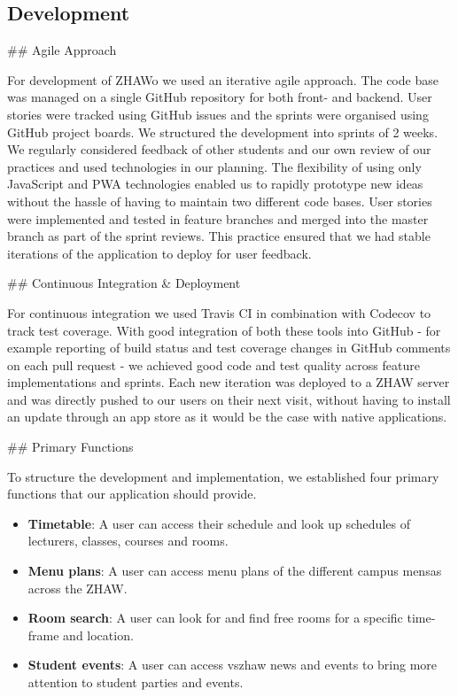 \begin{markdown}
\section{Development} \label{development}

## Agile Approach

For development of ZHAWo we used an iterative agile approach. The code base was managed on a single GitHub repository \cite{OurGithub} for both front- and backend. User stories were tracked using GitHub issues and the sprints were organised using GitHub project boards. We structured the development into sprints of 2 weeks. We regularly considered feedback of other students and our own review of our practices and used technologies in our planning. The flexibility of using only JavaScript and PWA technologies enabled us to rapidly prototype new ideas without the hassle of having to maintain two different code bases.
User stories were implemented and tested in feature branches and merged into the master branch as part of the sprint reviews. This practice ensured that we had stable iterations of the application to deploy for user feedback.

## Continuous Integration \& Deployment

For continuous integration we used Travis CI \cite{Travis} in combination with Codecov \cite{Codecov} to track test coverage. With good integration of both these tools into GitHub - for example reporting of build status and test coverage changes in GitHub comments on each pull request - we achieved good code and test quality across feature implementations and sprints.
Each new iteration was deployed to a ZHAW server and was directly pushed to our users on their next visit, without having to install an update through an app store as it would be the case with native applications.

## Primary Functions

To structure the development and implementation, we established four primary functions that our application should provide.

\begin{itemize}
  \item \textbf{Timetable}: A user can access their schedule and look up schedules of lecturers, classes, courses and rooms.
  \item \textbf{Menu plans}: A user can access menu plans of the different campus mensas across the ZHAW.
  \item \textbf{Room search}: A user can look for and find free rooms for a specific time-frame and location.
  \item \textbf{Student events}: A user can access vszhaw news and events to bring more attention to student parties and events.
\end{itemize}


\end{markdown}
